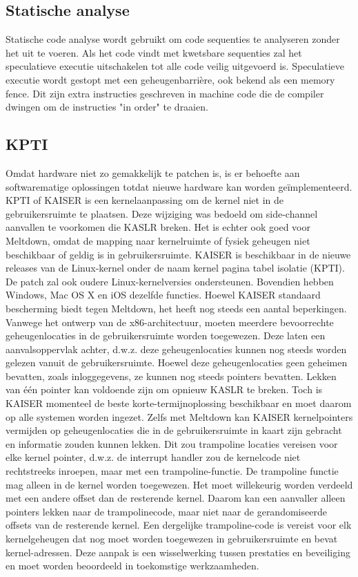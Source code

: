 \subsection{Statische analyse}
Statische code analyse wordt gebruikt om code sequenties te analyseren zonder het uit te voeren. Als het code vindt met kwetsbare sequenties zal het speculatieve executie uitschakelen tot alle code veilig uitgevoerd is.
Speculatieve executie wordt gestopt met een geheugenbarrière, ook bekend als een memory fence. Dit zijn extra instructies geschreven in machine code die de compiler dwingen om de instructies "in order" te draaien.


\subsection{KPTI}
Omdat hardware niet zo gemakkelijk te patchen is, is er behoefte aan
softwarematige oplossingen totdat nieuwe hardware kan worden geïmplementeerd.
KPTI of KAISER is een kernelaanpassing
om de kernel niet in de gebruikersruimte te plaatsen.
Deze wijziging was bedoeld om side-channel aanvallen te voorkomen
die KASLR breken. Het is echter ook
goed voor Meltdown, omdat de mapping naar kernelruimte of fysiek geheugen niet beschikbaar of geldig is 
in gebruikersruimte. KAISER is beschikbaar in de nieuwe
releases van de Linux-kernel onder de naam kernel
pagina tabel isolatie (KPTI). De patch zal ook
oudere Linux-kernelversies ondersteunen. Bovendien hebben Windows, Mac OS X en iOS dezelfde functies.
Hoewel KAISER standaard bescherming biedt tegen
Meltdown, het heeft nog steeds een aantal beperkingen. Vanwege het ontwerp
van de x86-architectuur, moeten meerdere bevoorrechte geheugenlocaties
 in de gebruikersruimte worden toegewezen. Deze
laten een aanvalsoppervlak achter, d.w.z. deze
geheugenlocaties kunnen nog steeds worden gelezen vanuit de gebruikersruimte. 
Hoewel deze geheugenlocaties geen geheimen bevatten,
zoals inloggegevens, ze kunnen nog steeds pointers bevatten.
Lekken van één pointer kan voldoende zijn om opnieuw KASLR te breken.
Toch is KAISER momenteel de beste korte-termijnoplossing
beschikbaar en moet daarom op alle systemen worden ingezet. Zelfs met Meltdown kan KAISER kernelpointers
vermijden op geheugenlocaties
die in de gebruikersruimte in kaart zijn gebracht en informatie zouden kunnen lekken. Dit zou 
trampoline locaties vereisen voor elke kernel pointer, d.w.z.
de interrupt handler zou de kernelcode niet rechtstreeks inroepen,
maar met een trampoline-functie. De trampoline
functie mag alleen in de kernel worden toegewezen. Het moet
willekeurig worden  verdeeld met een andere offset dan de resterende
kernel. Daarom kan een aanvaller alleen pointers lekken
naar de trampolinecode, maar niet naar de gerandomiseerde offsets van
de resterende kernel. Een dergelijke trampoline-code is vereist
voor elk kernelgeheugen dat nog moet worden toegewezen in
gebruikersruimte en bevat kernel-adressen. Deze aanpak 
is een wisselwerking tussen prestaties en beveiliging en
moet worden beoordeeld in toekomstige werkzaamheden.

